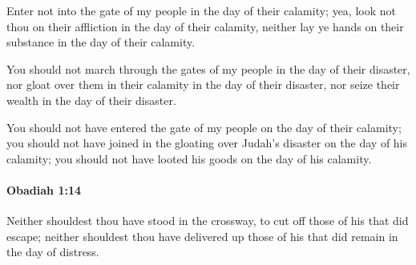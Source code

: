 			\begin{versebox}
					\item[BHS] 
					\item[LXX] 
					\item[ASV] Enter not into the gate of my people in the day of their calamity; yea, look not thou on their affliction in the day of their calamity, neither lay ye hands on their substance in the day of their calamity.
					\item[NIV] You should not march through the gates of my people in the day of their disaster, nor gloat over them in their calamity in the day of their disaster, nor seize their wealth in the day of their disaster.
					\item[NRSV] You should not have entered the gate of my people on the day of their calamity; you should not have joined in the gloating over Judah’s disaster on the day of his calamity; you should not have looted his goods on the day of his calamity.
			\end{versebox}

		\paragraph{Obadiah 1:14} %
			\label{OBADIAH-1-14}

			Neither shouldest thou have stood in the crossway, to cut off those of his that did escape; neither shouldest thou have delivered up those of his that did remain in the day of distress.

